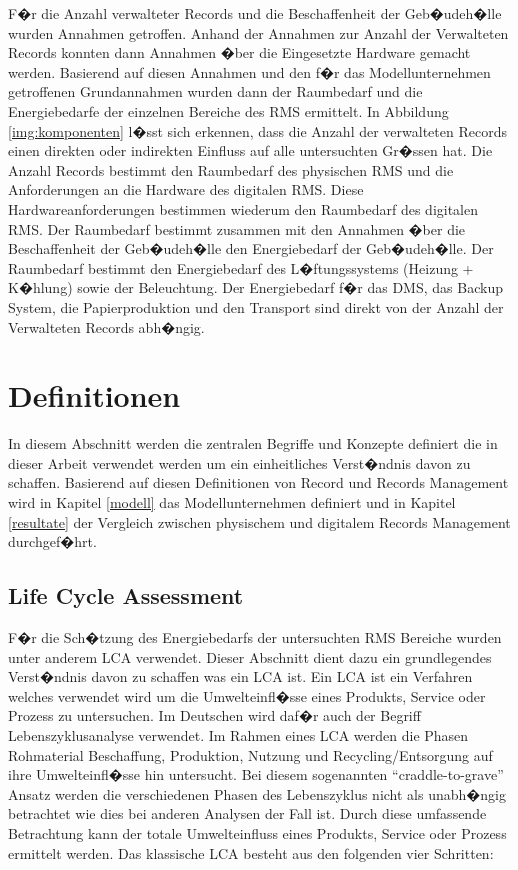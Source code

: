 \documentclass[a4paper,twoside,10pt]{report}
\begin{document}
F�r die Anzahl verwalteter Records und die Beschaffenheit der Geb�udeh�lle wurden Annahmen getroffen. Anhand der Annahmen zur Anzahl der Verwalteten Records konnten dann Annahmen �ber die Eingesetzte Hardware gemacht werden. Basierend auf diesen Annahmen und den f�r das Modellunternehmen getroffenen Grundannahmen wurden dann der Raumbedarf und die Energiebedarfe der einzelnen Bereiche des \ac{RMS} ermittelt. In Abbildung \ref{img:komponenten} l�sst sich erkennen, dass die Anzahl der verwalteten Records einen direkten oder indirekten Einfluss auf alle untersuchten Gr�ssen hat. Die Anzahl Records bestimmt den Raumbedarf des physischen \ac{RMS} und die Anforderungen an die Hardware des digitalen \ac{RMS}. Diese Hardwareanforderungen bestimmen wiederum den Raumbedarf des digitalen \ac{RMS}. Der Raumbedarf bestimmt zusammen mit den Annahmen �ber die Beschaffenheit der Geb�udeh�lle den Energiebedarf der Geb�udeh�lle. Der Raumbedarf bestimmt den Energiebedarf des L�ftungssystems (Heizung + K�hlung) sowie der Beleuchtung. Der Energiebedarf f�r das \ac{DMS}, das Backup System, die Papierproduktion und den Transport sind direkt von der Anzahl der Verwalteten Records abh�ngig. 

\section{Definitionen}\label{sec:definitionen}
In diesem Abschnitt werden die zentralen Begriffe und Konzepte definiert die in dieser Arbeit verwendet werden um ein einheitliches Verst�ndnis davon zu schaffen. Basierend auf diesen Definitionen von Record und Records Management wird in Kapitel \ref{modell} das Modellunternehmen definiert und in Kapitel \ref{resultate} der Vergleich zwischen physischem und digitalem Records Management durchgef�hrt.

\subsection{Life Cycle Assessment}\label{def_lca}
F�r die Sch�tzung des Energiebedarfs der untersuchten \ac{RMS} Bereiche wurden unter anderem \acf{LCA} verwendet. Dieser Abschnitt dient dazu ein grundlegendes Verst�ndnis davon zu schaffen was ein \ac{LCA} ist. Ein \ac{LCA} ist ein Verfahren welches verwendet wird um die Umwelteinfl�sse eines Produkts, Service oder Prozess zu untersuchen. Im Deutschen wird daf�r auch der Begriff Lebenszyklusanalyse verwendet. Im Rahmen eines \ac{LCA} werden die Phasen Rohmaterial Beschaffung, Produktion, Nutzung und Recycling/Entsorgung auf ihre Umwelteinfl�sse hin untersucht. Bei diesem sogenannten "`craddle-to-grave"' Ansatz werden die verschiedenen Phasen des Lebenszyklus nicht als unabh�ngig betrachtet wie dies bei anderen Analysen der Fall ist. Durch diese umfassende Betrachtung kann der totale Umwelteinfluss eines Produkts, Service oder Prozess ermittelt werden. Das klassische \ac{LCA} besteht aus den folgenden vier Schritten:
\end{document}
